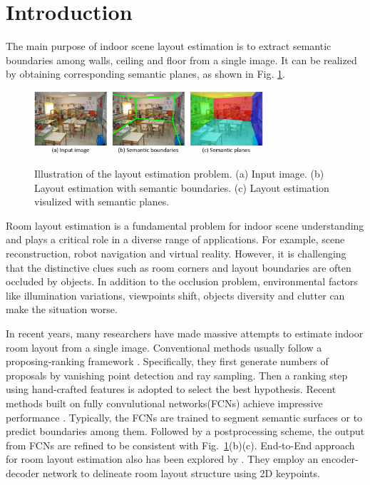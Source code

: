 \section{Introduction}
\label{sec:intro}

The main purpose of indoor scene layout estimation is to extract semantic boundaries among walls, ceiling and floor from a single image. It can be realized by obtaining corresponding semantic planes, as shown in Fig. \ref{fig:definition}. 


\begin{figure}[!ht]
	\centering
	\textsc{\includegraphics[width=8.5cm]{figure/def.png}}
	\caption{Illustration of the layout estimation problem. (a) Input image. (b) Layout estimation with semantic boundaries. (c) Layout estimation visulized with semantic planes.}
	\label{fig:definition}
\end{figure}


Room layout estimation is a fundamental problem for indoor scene understanding and plays a critical role in a diverse range of applications. For example, scene reconstruction, robot navigation and virtual reality. However, it is challenging that the distinctive clues such as room corners and layout boundaries are often occluded by objects. In addition to the occlusion problem, environmental factors like illumination variations, viewpoints shift, objects diversity and clutter can make the situation worse.


In recent years, many researchers have made massive attempts to estimate indoor room layout from a single image. Conventional methods usually follow a proposing-ranking framework \cite{hedau2009recovering,wang2013discriminative,gupta2010estimating,hedau2010thinking}. Specifically, they first generate numbers of proposals by vanishing point detection and ray sampling. Then a ranking step using hand-crafted features is adopted to select the best hypothesis. Recent methods built on fully convulutional networks(FCNs) achieve impressive performance \cite{mallya2015learning,ren2016coarse,zhang2016learning,dasgupta2016delay,zhao2017physics}. Typically, the FCNs are trained to segment semantic surfaces or to predict boundaries among them. Followed by a postprocessing scheme, the output from FCNs are refined to be consistent with Fig.~\ref{fig:definition}(b)(c). End-to-End approach for room layout estimation also has been explored by \cite{LeeRoomNet17}. They employ an encoder-decoder network to delineate room layout structure using
2D keypoints. 

